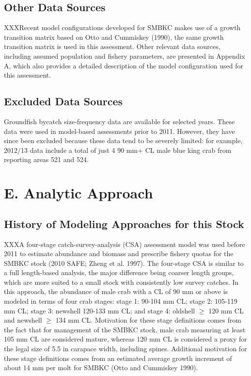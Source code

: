 \documentclass[]{article}
\begin{document}
\subsection{Other Data Sources}\label{other-data-sources}

XXXRecent model configurations developed for SMBKC makes use of a growth
transition matrix based on Otto and Cummiskey (1990), the same growth
transition matrix is used in this assessment. Other relevant data
sources, including assumed population and fishery parameters, are
presented in Appendix A, which also provides a detailed description of
the model configuration used for this assessment.

\subsection{Excluded Data Sources}\label{excluded-data-sources}

Groundfish bycatch size-frequency data are available for selected years.
These data were used in model-based assessments prior to 2011. However,
they have since been excluded because these data tend to be severely
limited: for example, 2012/13 data include a total of just 4 90 mm+ CL
male blue king crab from reporting areas 521 and 524.

\newpage

\clearpage

\section{E. Analytic Approach}\label{e.-analytic-approach}

\subsection{History of Modeling Approaches for this
Stock}\label{history-of-modeling-approaches-for-this-stock}

XXXA four-stage catch-survey-analysis (CSA) assessment model was used
before 2011 to estimate abundance and biomass and prescribe fishery
quotas for the SMBKC stock (2010 SAFE; Zheng et al. 1997). The
four-stage CSA is similar to a full length-based analysis, the major
difference being coarser length groups, which are more suited to a small
stock with consistently low survey catches. In this approach, the
abundance of male crab with a CL of 90 mm or above is modeled in terms
of four crab stages: stage 1: 90-104 mm CL; stage 2: 105-119 mm CL;
stage 3: newshell 120-133 mm CL; and stage 4: oldshell \(\ge\) 120 mm CL
and newshell \(\ge\) 134 mm CL. Motivation for these stage definitions
comes from the fact that for management of the SMBKC stock, male crab
measuring at least 105 mm CL are considered mature, whereas 120 mm CL is
considered a proxy for the legal size of 5.5 in carapace width,
including spines. Additional motivation for these stage definitions
comes from an estimated average growth increment of about 14 mm per molt
for SMBKC (Otto and Cummiskey 1990).
\end{document}
